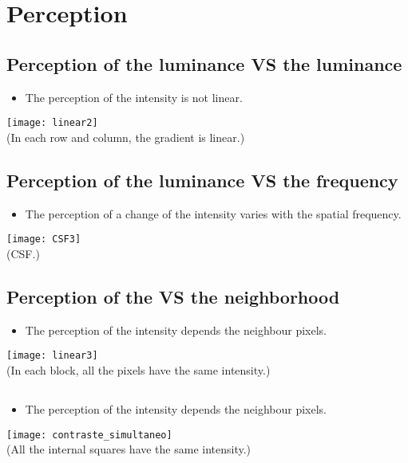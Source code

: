 \chapter{Perception}

\section{Perception of the luminance VS the luminance}
\begin{itemize}
\item The perception of the intensity is not linear.
\end{itemize}
\begin{center}
  \texttt{[image: linear2]}\\
  (In each row and column, the gradient is linear.)
\end{center}

\section{Perception of the luminance VS the frequency}
\begin{itemize}
\item The perception of a change of the intensity varies with the spatial frequency.
\end{itemize}
\begin{center}
  \texttt{[image: CSF3]}\\
  (\gls{CSF}.)
\end{center}

\section{Perception of the  VS the neighborhood}
\begin{itemize}
\item The perception of the intensity depends the neighbour pixels.
\end{itemize}
\begin{center}
  \texttt{[image: linear3]}\\
  (In each block, all the pixels have the same intensity.)
\end{center}

\section*{}
\begin{itemize}
\item The perception of the intensity depends the neighbour pixels.
\end{itemize}
\begin{center}
  \texttt{[image: contraste\_simultaneo]}\\
  (All the internal squares have the same intensity.)
\end{center}


